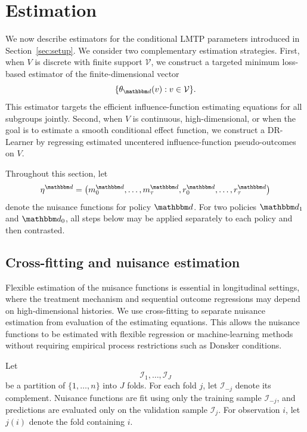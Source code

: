 \documentclass[11pt]{article}
\begin{document}
\section{Estimation}
\label{sec:estimation}

We now describe estimators for the conditional LMTP parameters introduced in
Section~\ref{sec:setup}. We consider two complementary estimation strategies.
First, when \(V\) is discrete with finite support \(\mathcal V\), we construct a
targeted minimum loss-based estimator of the finite-dimensional vector
\[
  \{\theta_{\mathbbm d}(v):v\in\mathcal V\}.
\]
This estimator targets the efficient influence-function estimating equations
for all subgroups jointly. Second, when \(V\) is continuous, high-dimensional, or
when the goal is to estimate a smooth conditional effect function, we construct
a DR-Learner by regressing estimated uncentered influence-function
pseudo-outcomes on \(V\).

Throughout this section, let
\[
  \eta^{\mathbbm d}
  =
  \left(
    m_0^{\mathbbm d},\ldots,m_\tau^{\mathbbm d},
    r_0^{\mathbbm d},\ldots,r_\tau^{\mathbbm d}
  \right)
\]
denote the nuisance functions for policy \(\mathbbm d\). For two policies
\(\mathbbm d_1\) and \(\mathbbm d_0\), all steps below may be applied separately
to each policy and then contrasted.

\subsection{Cross-fitting and nuisance estimation}
\label{subsec:crossfitting-nuisance}

Flexible estimation of the nuisance functions is essential in longitudinal
settings, where the treatment mechanism and sequential outcome regressions may
depend on high-dimensional histories. We use cross-fitting to separate nuisance
estimation from evaluation of the estimating equations. This allows the nuisance
functions to be estimated with flexible regression or machine-learning methods
without requiring empirical process restrictions such as Donsker conditions.

Let
\[
  \mathcal I_1,\ldots,\mathcal I_J
\]
be a partition of \(\{1,\ldots,n\}\) into \(J\) folds. For each fold \(j\), let
\(\mathcal I_{-j}\) denote its complement. Nuisance functions are fit using only
the training sample \(\mathcal I_{-j}\), and predictions are evaluated only on
the validation sample \(\mathcal I_j\). For observation \(i\), let \(j(i)\)
denote the fold containing \(i\).
\end{document}
